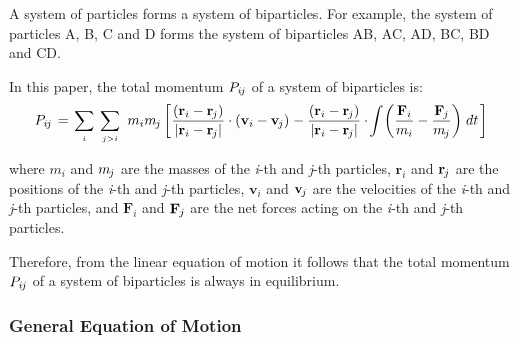 \documentclass[10pt]{article}
\newcommand{\mM}{m}
\newcommand{\mP}{P}
\newcommand{\ri}{_i}
\newcommand{\vR}{\mathbf{r}}
\newcommand{\vV}{\mathbf{v}}
\newcommand{\vF}{\mathbf{F}}
\newcommand{\rj}{_{\hspace{-0.081em}j}}
\newcommand{\rij}{_{i\hspace{-0.081em}j}}
\begin{document}
\par A system of particles forms a system of biparticles. For example, the system of particles A, B, C and D forms the system of biparticles AB, AC, AD, BC, BD and CD.
\medskip
\par In this paper, the total momentum $\mP\rij$ of a system of biparticles is:
{\fontsize{8}{8}\selectfont\begin{eqnarray*}
\mP\rij \hspace{+0.12em} = \hspace{+0.12em} \sum_{\scriptscriptstyle i} \hspace{+0.24em} \sum_{\scriptscriptstyle j>i} \hspace{+0.36em} \mM\ri\mM\rj \left[ \hspace{+0.03em} \frac{(\vR\ri - \vR\rj)}{|\vR\ri - \vR\rj|} \cdot (\vV\ri - \vV\rj) \hspace{+0.06em} - \frac{(\vR\ri - \vR\rj)}{|\vR\ri - \vR\rj|} \cdot \hspace{-0.12em} \int \hspace{-0.12em} \left(\frac{\vF\ri}{\mM\ri} - \frac{\vF\rj}{\mM\rj}\right) \hspace{+0.12em} dt \hspace{+0.12em} \right]
\end{eqnarray*}}
\vspace{-0.60em}
\par \noindent where $\mM\ri$ and $\mM\rj$ are the masses of the \textit{i}-th and \textit{j}-th particles, $\vR\ri$ and $\vR\rj$ are the positions of the \textit{i}-th and \textit{j}-th particles, $\vV\ri$ and $\vV\rj$ are the velocities of the \textit{i}-th and \textit{j}-th particles, and $\vF\ri$ and $\vF\rj$ are the net forces acting on the \textit{i}-th and \textit{j}-th particles.
\medskip
\par Therefore, from the linear equation of motion it follows that the total momentum $\mP\rij$ of a system of biparticles is always in equilibrium.

\vspace{+1.50em}

{\centering\subsubsection*{General Equation of Motion}}

\vspace{+1.20em}
\end{document}

